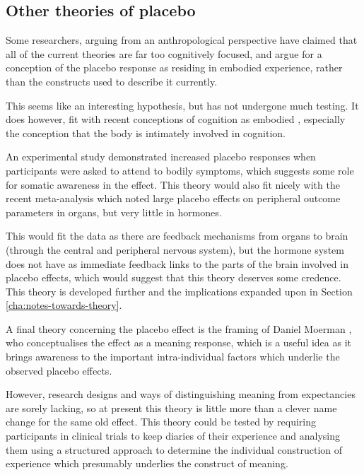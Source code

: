 \subsection{Other theories of placebo}
\label{sec:other-theor-plac}

Some researchers, arguing from an anthropological perspective \cite{Thompson2009}  have claimed that all of the current theories are far too cognitively focused, and argue for a conception of the placebo response as residing in embodied experience, rather than the constructs used to describe it currently. 

This seems like an interesting hypothesis, but has not undergone much testing. It does however, fit with recent conceptions of cognition as embodied \cite{wilson2002six}, especially the conception that the body is intimately involved in cognition.  

An experimental study \cite{Geers2006} demonstrated increased placebo responses when participants were asked to attend to bodily symptoms, which suggests some role for somatic awareness in the effect. This theory would also fit nicely with the recent meta-analysis \cite{Meissner2007} which noted large placebo effects on peripheral outcome parameters in organs, but very little in hormones. 

This would fit the data as there are feedback mechanisms from organs to brain (through the central and peripheral nervous system), but the hormone system does not have as immediate feedback links to the parts of the brain involved in placebo effects, which would suggest that this theory deserves some credence. This theory is developed further and the implications expanded upon in Section \ref{cha:notes-towards-theory}.

A final theory concerning the placebo effect is the framing of Daniel Moerman \cite{Moerman2000a,Moerman2003}, who conceptualises the effect as a meaning response, which is a useful idea as it brings awareness to the important intra-individual factors which underlie the observed placebo effects. 

However, research designs and ways of distinguishing meaning from expectancies are sorely lacking, so at present this theory is little more than a clever name change for the same old effect.  This theory  could be tested by requiring participants in clinical trials to keep diaries of their experience and analysing them using a structured approach to determine the individual construction of experience which presumably underlies the construct of meaning. 


